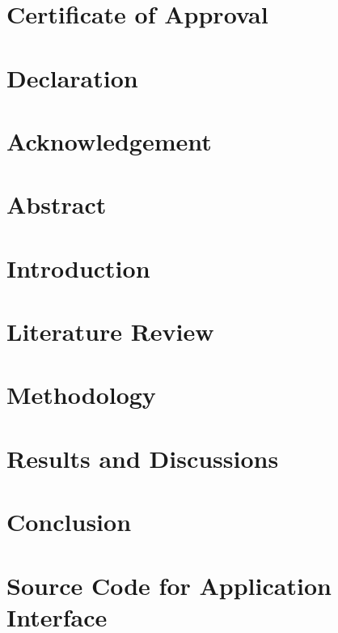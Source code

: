 \documentclass[12pt]{report}
\begin{document}
 
 \setcounter{page}{1}
 
\chapter*{\centering Certificate of Approval}

\clearpage

\chapter*{\centering Declaration}

\clearpage


\chapter*{\centering Acknowledgement}

\clearpage

\chapter*{\centering Abstract}

\clearpage

    \tableofcontents
    \listoffigures
    \listoftables
    \clearpage
{}

    \chapter{Introduction} 
    
   
    \chapter{Literature Review}
         
    
    \chapter{Methodology}
     
     
    \chapter{Results and Discussions}
    
    
    \chapter{Conclusion}
    
    
    
    
    
    
 \appendix
\chapter{Source Code for Application Interface}
    

 
\end{document}
